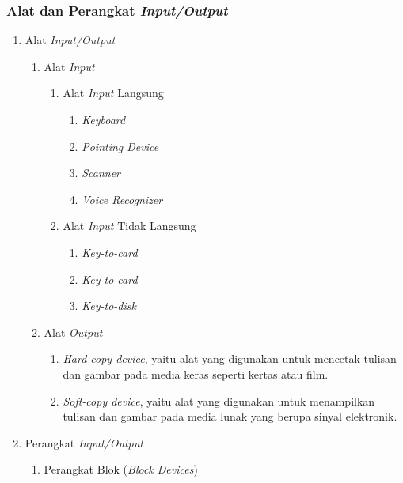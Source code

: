 \documentclass[12pt]{article}
\begin{document}
\subsubsection{Alat dan Perangkat \textit{Input/Output}}
\begin{enumerate}
    \item Alat \textit{Input/Output}
    \begin{enumerate}
        \item Alat \textit{Input}
        \begin{enumerate}
            \item Alat \textit{Input} Langsung
            \begin{enumerate}
                \item \textit{Keyboard}
                \item \textit{Pointing Device}
                \item \textit{Scanner}
                \item \textit{Voice Recognizer}
            \end{enumerate}
            \item Alat \textit{Input} Tidak Langsung
            \begin{enumerate}
                \item \textit{Key-to-card}
                \item \textit{Key-to-card}
                \item \textit{Key-to-disk}
            \end{enumerate}
        \end{enumerate}
        \item Alat \textit{Output}
        \begin{enumerate}
            \item \textit{Hard-copy device}, yaitu alat yang digunakan untuk mencetak tulisan dan gambar pada media keras seperti kertas atau film.
            \item \textit{Soft-copy device}, yaitu alat yang digunakan untuk menampilkan tulisan dan gambar pada media lunak yang berupa sinyal elektronik.
        \end{enumerate}
    \end{enumerate}
    \item Perangkat \textit{Input/Output}
    \begin{enumerate}
        \item Perangkat Blok (\textit{Block Devices})
        \begin{enumerate}

\end{enumerate}
\end{enumerate}
\end{enumerate}
\end{document}
